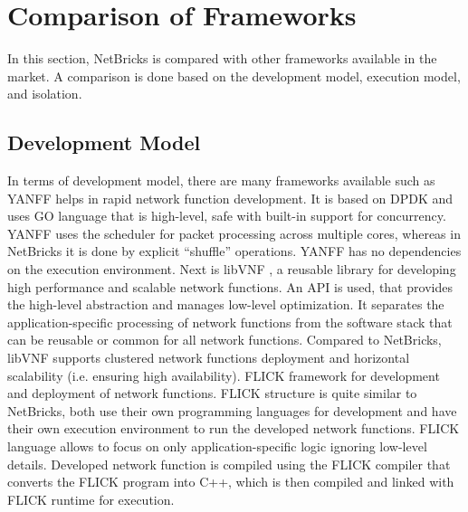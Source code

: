 \documentclass[10pt, a4paper, conference]{IEEEtran}
\begin{document}
\section{Comparison of Frameworks}
In this section, NetBricks is compared with other frameworks available in the market. A comparison is done based on the development model, execution model, and isolation.
\subsection{Development Model}
In terms of development model, there are many frameworks available such as YANFF \cite{Philippov2017} helps in rapid network function development. It is based on DPDK and uses GO language that is high-level, safe with built-in support for concurrency. YANFF uses the scheduler for packet processing across multiple cores, whereas in NetBricks it is done by explicit “shuffle” operations. YANFF has no dependencies on the execution environment. Next is libVNF \cite{Naik2017}, a reusable library for developing high performance and scalable network functions. An API is used, that provides the high-level abstraction and manages low-level optimization. It separates the application-specific processing of network functions from the software stack that can be reusable or common for all network functions. Compared to NetBricks, libVNF supports clustered network functions deployment and horizontal scalability (i.e. ensuring high availability). FLICK \cite{Abdul} framework for development and deployment of network functions. FLICK structure is quite similar to NetBricks, both use their own programming languages for development and have their own execution environment to run the developed network functions. FLICK language allows to focus on only application-specific logic ignoring low-level details. Developed network function is compiled using the FLICK compiler that converts the FLICK program into C++, which is then compiled and linked with FLICK runtime for execution.
\end{document}
